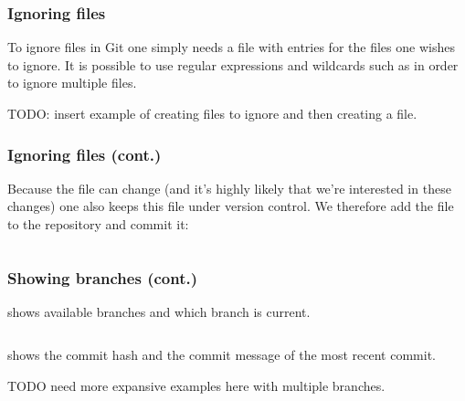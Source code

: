 \documentclass{git_course}
\begin{document}
\begin{frame}
\frametitle{Ignoring files}

To ignore files in Git one simply needs a  file with
entries for the files one wishes to ignore. It is possible to use
regular expressions and wildcards such as  in order to ignore
multiple files.

TODO: insert example of creating files to ignore and then creating a
 file.
\end{frame}

\begin{frame}[fragile]
\frametitle{Ignoring files (cont.)}

Because the  file can change (and it’s highly likely
that we’re interested in these changes) one also keeps this file under
version control. We therefore add the file to the repository and commit
it:

    \inputminted{bash}{add-gitignore.txt}
\end{frame}

\begin{frame}[fragile]
\frametitle{Showing branches (cont.)}
 shows available branches and which branch is
current.

    \inputminted{bash}{git-branch-output.txt}

 shows the commit hash and the commit
message of the most recent commit.

TODO need more expansive examples here with multiple branches.

    \inputminted{bash}{git-branch-v-output.txt}
\end{frame}
\end{document}
